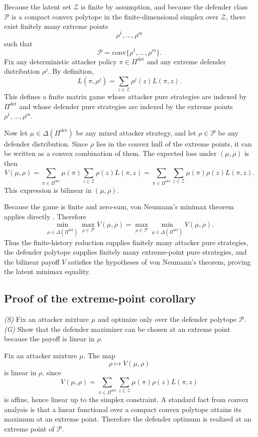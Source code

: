 \documentclass[11pt]{article}
\newcommand{\Zset}{\mathcal{Z}}
\newcommand{\Pset}{\mathcal{P}}
\begin{document}
Because the latent set $\Zset$ is finite by assumption, and because the defender class $\Pset$ is a compact convex polytope in the finite-dimensional simplex over $\Zset$, there exist finitely many extreme points
\[
\rho^1,\dots,\rho^m
\]
such that
\[
\Pset=\mathrm{conv}\{\rho^1,\dots,\rho^m\}.
\]
Fix any deterministic attacker policy $\pi\in\Pi^{\det}$ and any extreme defender distribution $\rho^j$. By definition,
\[
L(\pi,\rho^j)=\sum_{z\in\Zset}\rho^j(z)L(\pi,z).
\]
This defines a finite matrix game whose attacker pure strategies are indexed by $\Pi^{\det}$ and whose defender pure strategies are indexed by the extreme points $\rho^1,\dots,\rho^m$.

Now let $\mu\in\Delta(\Pi^{\det})$ be any mixed attacker strategy, and let $\rho\in\Pset$ be any defender distribution. Since $\rho$ lies in the convex hull of the extreme points, it can be written as a convex combination of them. The expected loss under $(\mu,\rho)$ is then
\[
V(\mu,\rho)
=
\sum_{\pi\in\Pi^{\det}}\mu(\pi)\sum_{z\in\Zset}\rho(z)L(\pi,z)
=
\sum_{\pi\in\Pi^{\det}}\sum_{z\in\Zset}\mu(\pi)\rho(z)L(\pi,z).
\]
This expression is bilinear in $(\mu,\rho)$.

Because the game is finite and zero-sum, von Neumann's minimax theorem applies directly \citep{vonNeumann1928}. Therefore
\[
\min_{\mu\in\Delta(\Pi^{\det})}\max_{\rho\in\Pset}V(\mu,\rho)
=
\max_{\rho\in\Pset}\min_{\mu\in\Delta(\Pi^{\det})}V(\mu,\rho).
\]
Thus the finite-history reduction supplies finitely many attacker pure strategies, the defender polytope supplies finitely many extreme-point pure strategies, and the bilinear payoff $V$ satisfies the hypotheses of von Neumann's theorem, proving the latent minimax equality.

\subsection{Proof of the extreme-point corollary}

\noindent\textit{(S)} Fix an attacker mixture $\mu$ and optimize only over the defender polytope $\Pset$. \textit{(G)} Show that the defender maximizer can be chosen at an extreme point because the payoff is linear in $\rho$.

Fix an attacker mixture $\mu$. The map
\[
\rho \mapsto V(\mu,\rho)
\]
is linear in $\rho$, since
\[
V(\mu,\rho)=\sum_{\pi\in\Pi^{\det}}\sum_{z\in\Zset}\mu(\pi)\rho(z)L(\pi,z)
\]
is affine, hence linear up to the simplex constraint. A standard fact from convex analysis is that a linear functional over a compact convex polytope attains its maximum at an extreme point. Therefore the defender optimum is realized at an extreme point of $\Pset$.
\end{document}

